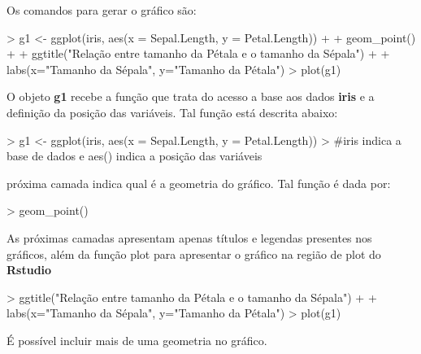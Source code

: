 \documentclass[12pt,a4paper,oneside]{erdc}
\begin{document}
\newpage

Os comandos para gerar o gráfico são:

\begin{Schunk}
\begin{Sinput}
> g1 <- ggplot(iris, aes(x = Sepal.Length, y = Petal.Length)) + 
+ geom_point() +
+ ggtitle("Relação entre tamanho da Pétala e o tamanho da Sépala") +
+ labs(x="Tamanho da Sépala", y="Tamanho da Pétala")
> plot(g1)
\end{Sinput}
\end{Schunk}

O objeto \textbf{g1} recebe a função que trata do acesso a base aos dados \textbf{iris} e a definição da posição das variáveis. Tal função está descrita abaixo:

\begin{Schunk}
\begin{Sinput}
> g1 <- ggplot(iris, aes(x = Sepal.Length, y = Petal.Length))
> #iris indica a base de dados e aes() indica a posição das variáveis
\end{Sinput}
\end{Schunk}

 próxima camada indica qual é a geometria do gráfico. Tal função é dada por:

\begin{Schunk}
\begin{Sinput}
> geom_point()
\end{Sinput}
\end{Schunk}

As próximas camadas apresentam apenas títulos e legendas presentes nos gráficos, além da função plot para apresentar o gráfico na região de plot do \textbf{Rstudio}

\begin{Schunk}
\begin{Sinput}
> ggtitle("Relação entre tamanho da Pétala e o tamanho da Sépala") +
+ labs(x="Tamanho da Sépala", y="Tamanho da Pétala")
> plot(g1)
\end{Sinput}
\end{Schunk}

É possível incluir mais de uma geometria no gráfico.
\end{document}
